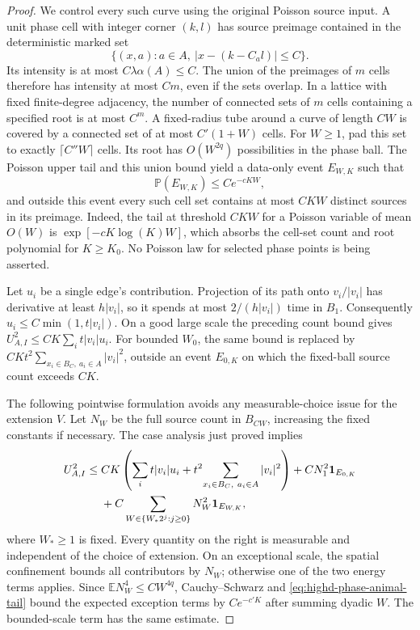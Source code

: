 \documentclass[11pt,reqno]{amsart}
\theoremstyle{definition}
\theoremstyle{remark}
\numberwithin{equation}{section}
\newcommand{\E}{\mathbb E}
\newcommand{\Pp}{\mathbb P}
\begin{document}
\begin{proof}
We control every such curve using the original Poisson source input.
A unit phase cell with integer corner \((k,l)\) has source preimage
contained in the deterministic marked set
\[
 \{(x,a):a\in A,\ |x-(k-C_al)|\le C\}.
\]
Its intensity is at most \(C\lambda\alpha(A)\le C\). The union
of the preimages of \(m\) cells therefore has intensity at most \(Cm\),
even if the sets overlap. In a lattice with fixed finite-degree
adjacency, the number of connected sets of \(m\) cells containing a
specified root is at most \(C^{m}\). A fixed-radius tube around a curve
of length \(CW\) is covered by a connected set of at most \(C'(1+W)\)
cells. For \(W\ge1\), pad this set to exactly \(\lceil C''W\rceil\)
cells. Its root has \(O(W^{2q})\) possibilities in the phase ball.
The Poisson upper tail and this union bound yield a data-only event
\(E_{W,K}\) such that
\begin{equation}
\label{eq:highd-phase-animal-tail}
 \Pp(E_{W,K})\le Ce^{-cKW},
\end{equation}
and outside this event every such cell set contains at most \(CKW\)
distinct sources in its preimage. Indeed, the tail at threshold
\(CKW\) for a Poisson variable of mean \(O(W)\) is
\(\exp[-cK\log(K)W]\), which absorbs the cell-set count and root
polynomial for \(K\ge K_0\). No Poisson law for selected phase points
is being asserted.

Let \(u_i\) be a single edge's contribution. Projection of its path
onto \(v_i/|v_i|\) has derivative at least \(h|v_i|\), so it spends
at most \(2/(h|v_i|)\) time in \(B_1\). Consequently
\(u_i\le C\min(1,t|v_i|)\). On a good large scale the preceding
count bound gives
\(U_{A,I}^2\le CK\sum_i t|v_i|u_i\).
For bounded \(W_0\), the same bound is replaced by
\(CKt^2\sum_{x_i\in B_C,\ a_i\in A}|v_i|^2\), outside an event
\(E_{0,K}\) on which the fixed-ball source count exceeds \(CK\).

The following pointwise formulation avoids any measurable-choice issue
for the extension \(V\). Let \(N_W\) be the full source count in
\(B_{CW}\), increasing the fixed constants if necessary. The case
analysis just proved implies
\begin{align}
\label{eq:highd-measurable-traffic-majorant}
 U_{A,I}^2\le{}&CK\left(\sum_i t|v_i|u_i
       +t^2\!\sum_{x_i\in B_C,\ a_i\in A}|v_i|^2\right)
       +CN_1^2\mathbf1_{E_{0,K}}\notag\\
 &+C\sum_{W\in\{W_*2^j:j\ge0\}}
                  N_W^2\mathbf1_{E_{W,K}},
\end{align}
where \(W_*\ge1\) is fixed. Every quantity on the right is measurable
and independent of the choice of extension. On an exceptional scale,
the spatial confinement bounds all contributors by \(N_W\); otherwise
one of the two energy terms applies. Since
\(\E N_W^4\le CW^{4q}\), Cauchy--Schwarz and
\eqref{eq:highd-phase-animal-tail} bound the expected exception terms
by \(Ce^{-c'K}\) after summing dyadic \(W\). The bounded-scale term
has the same estimate.


\end{proof}
\end{document}
